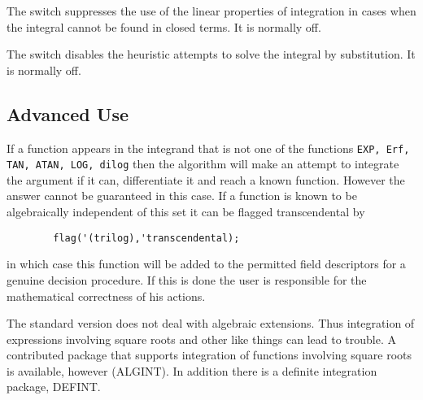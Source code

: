 The switch  suppresses the use of the linear properties of
integration in cases when the integral cannot be found in closed terms.
It is normally off.

The switch  disables the heuristic attempts to solve
the integral by substitution. It is normally off.

\subsection{Advanced Use}
\hypertarget{operator:ERF}{}

If a function appears in the integrand that is not one of the functions
\texttt{EXP, Erf, TAN, ATAN, LOG, dilog}
then the algorithm will make an
attempt to integrate the argument if it can, differentiate it and reach a
known function.  However the answer cannot be guaranteed in this case.  If
a function is known to be algebraically independent of this set it can be
flagged transcendental by
\begin{verbatim}
        flag('(trilog),'transcendental);
\end{verbatim}
in which case this function will be added to the permitted field
descriptors for a genuine decision procedure. If this is done the user is
responsible for the mathematical correctness of his actions.

The standard version does not deal with algebraic extensions. Thus
integration of expressions involving square roots and other like things
can lead to trouble.  A contributed package that supports integration of
functions involving square roots is available, however
(ALGINT).
In addition there is a definite integration
package, DEFINT.

%
%
%

